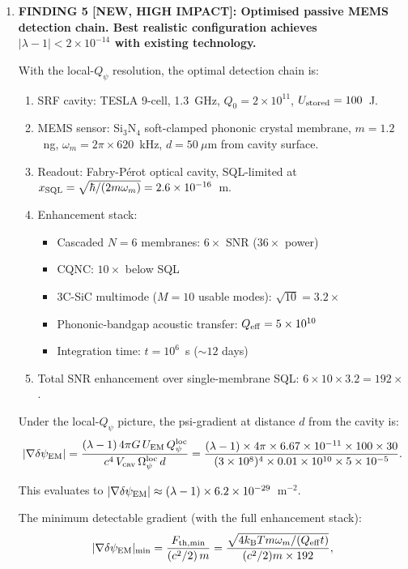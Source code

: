 \documentclass[11pt]{article}
\newcommand{\Opsi}{\Omega_\psi}
\newcommand{\ee}[1]{\times 10^{#1}}
\newcommand{\kB}{k_{\mathrm{B}}}
\newcommand{\Vcav}{V_{\rm cav}}
\newcommand{\dpsiEM}{\delta\psi_{\rm EM}}
\theoremstyle{definition}
\theoremstyle{remark}
\begin{document}
\begin{tcolorbox}[colback=blue!5!white, colframe=blue!60!black,
  title=\textbf{W4i16 TOP 5 FINDINGS --- Ranked by Programme Impact}]
\begin{enumerate}
\item \textbf{FINDING 5 [NEW, HIGH IMPACT]: Optimised passive MEMS
detection chain. Best realistic configuration achieves
$|\lambda-1| < 2\ee{-14}$ with existing technology.}

With the local-$Q_\psi$ resolution, the optimal detection chain is:
\begin{enumerate}[nosep]
\item SRF cavity: TESLA 9-cell, 1.3~GHz, $Q_0 = 2\ee{11}$,
  $U_{\rm stored} = 100$~J.
\item MEMS sensor: Si$_3$N$_4$ soft-clamped phononic crystal membrane,
  $m = 1.2$~ng, $\omega_m = 2\pi \times 620$~kHz, $d = 50~\mu$m from
  cavity surface.
\item Readout: Fabry-P\'erot optical cavity, SQL-limited at
  $x_{\rm SQL} = \sqrt{\hbar/(2m\omega_m)} = 2.6\ee{-16}$~m.
\item Enhancement stack:
  \begin{itemize}[nosep]
  \item Cascaded $N = 6$ membranes: $6\times$ SNR ($36\times$ power)
  \item CQNC: $10\times$ below SQL
  \item 3C-SiC multimode ($M = 10$ usable modes): $\sqrt{10} = 3.2\times$
  \item Phononic-bandgap acoustic transfer: $Q_{\rm eff} = 5\ee{10}$
  \item Integration time: $t = 10^6$~s ($\sim 12$ days)
  \end{itemize}
\item Total SNR enhancement over single-membrane SQL: $6 \times 10
  \times 3.2 = 192\times$.
\end{enumerate}

Under the local-$Q_\psi$ picture, the psi-gradient at distance $d$
from the cavity is:
\begin{equation}
|\nabla\dpsiEM| = \frac{(\lambda-1)\,4\pi G\,U_{\rm EM}\,Q_\psi^{\rm loc}}
{c^4\,\Vcav\,\Opsi^{\rm loc}\,d}
= \frac{(\lambda-1) \times 4\pi \times 6.67\ee{-11} \times 100 \times 30}
{(3\ee{8})^4 \times 0.01 \times 10^{10} \times 5\ee{-5}}.
\end{equation}

This evaluates to $|\nabla\dpsiEM| \approx (\lambda-1) \times 6.2\ee{-29}$~m$^{-2}$.

The minimum detectable gradient (with the full enhancement stack):
\begin{equation}
|\nabla\dpsiEM|_{\rm min} = \frac{F_{\rm th,min}}{(c^2/2)\,m}
= \frac{\sqrt{4\kB T m \omega_m / (Q_{\rm eff} t)}}{(c^2/2) m \times 192},
\end{equation}


\end{enumerate}
\end{tcolorbox}
\end{document}
